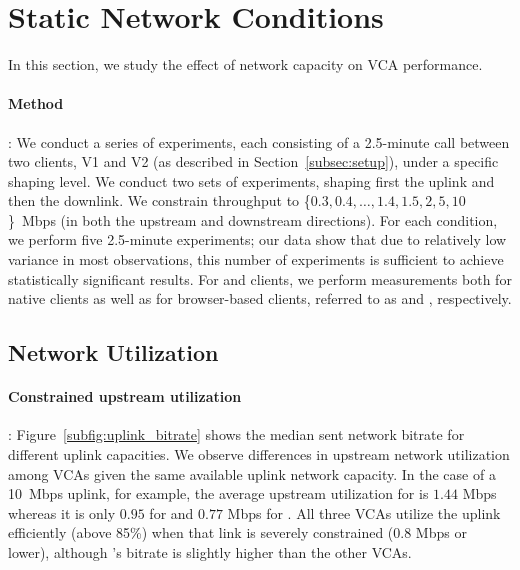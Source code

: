 \section{Static Network Conditions}\label{sec:static}

In this section, we study the effect of network capacity on VCA performance.

\paragraph{Method}: We conduct a series of experiments, each consisting of a
2.5-minute call between two clients, V1 and V2 (as described in
Section~\ref{subsec:setup}), under a specific shaping level. We conduct two
sets of experiments, shaping first the uplink and then the downlink.  We
constrain throughput to \{$0.3, 0.4, \dots, 1.4, 1.5, 2, 5, 10$\}~Mbps (in
both the upstream and downstream directions). For each condition, we perform five 2.5-minute experiments; our
data show that due to relatively low variance in most observations, this
number of experiments is sufficient to achieve statistically significant
results.  For \zoom and \teams clients, we perform measurements both for
native clients as well as for browser-based clients, referred to as
\zoombrowser and \teamsbrowser, respectively. 





\subsection{Network Utilization}
\label{subsec:network_utilization}

\paragraph{Constrained upstream utilization}: Figure~\ref{subfig:uplink_bitrate} shows the
median sent network bitrate for different uplink capacities. We observe differences in upstream network
utilization among VCAs given the same available uplink network capacity. In
the case of a 10~Mbps uplink, for example, the average upstream utilization for
\teamsnative is $1.44$ Mbps whereas it is only $0.95$ for \meet and $0.77$
Mbps for \zoom. All three VCAs utilize the uplink efficiently (above 85\%)
when that link is severely constrained (0.8 Mbps or lower), although \meet's
bitrate is slightly higher than the other VCAs.  

